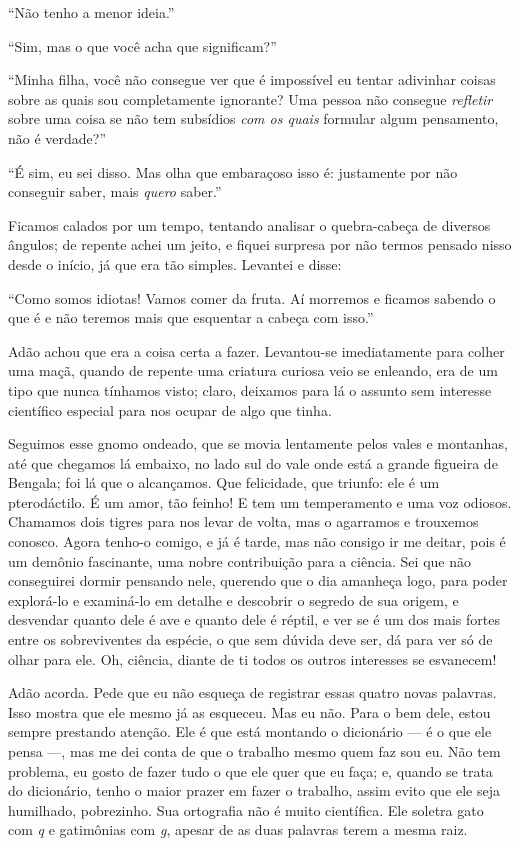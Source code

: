 “Não tenho a menor ideia.”

“Sim, mas o que você acha que significam?”

“Minha filha, você não consegue ver que é impossível eu tentar adivinhar
coisas sobre as quais sou
completamente ignorante? Uma pessoa não consegue \textit{refletir} sobre uma coisa se
não tem subsídios \textit{com os quais} formular algum pensamento, não
é verdade?”

“É sim, eu sei disso. Mas olha que embaraçoso isso é: justamente por não conseguir
saber, mais \textit{quero} saber.”

Ficamos calados por um tempo, tentando analisar o quebra-cabeça de diversos
ângulos; de repente achei um jeito, e fiquei surpresa por não termos pensado
nisso desde o início, já que era tão simples. Levantei e disse:

“Como somos idiotas! Vamos comer da fruta. Aí morremos e ficamos sabendo o que é e
não teremos mais que esquentar a cabeça com isso.”

Adão achou que era a coisa certa a fazer. Levantou-se imediatamente para colher
uma maçã, quando de repente uma criatura curiosa veio se enleando, era de um
tipo que nunca tínhamos visto; claro, deixamos para lá o assunto sem interesse
científico especial para nos ocupar de algo que tinha.

Seguimos esse gnomo ondeado, que se movia lentamente pelos vales e montanhas, até
que chegamos lá embaixo, no lado sul do vale onde está a grande figueira de
Bengala; foi lá que o alcançamos. Que felicidade, que triunfo: ele é um
pterodáctilo. É um amor, tão feinho! E tem um temperamento e uma voz odiosos.
Chamamos dois tigres para nos levar de volta, mas o agarramos e trouxemos
conosco. Agora tenho-o comigo, e já é tarde, mas não consigo ir me deitar, pois é
um demônio fascinante, uma nobre contribuição para a ciência. Sei que não
conseguirei dormir pensando nele, querendo que o dia amanheça logo, para poder
explorá-lo e examiná-lo em detalhe e descobrir o segredo de sua origem, e
desvendar quanto dele é ave e quanto dele é réptil, e ver se é um dos mais fortes
entre os sobreviventes da espécie, o que sem dúvida deve ser, dá para ver só de
olhar para ele. Oh, ciência, diante de ti todos os outros interesses se esvanecem!

Adão acorda. Pede que eu não esqueça de registrar essas quatro novas palavras. Isso
mostra que ele mesmo já as esqueceu. Mas eu não. Para o bem dele, estou sempre
prestando atenção. Ele é que está montando o dicionário --- é o que ele pensa ---, mas
me dei conta de que o trabalho mesmo quem faz sou eu. Não tem problema, eu gosto
de fazer tudo o que ele quer que eu faça; e, quando se trata do dicionário,
tenho o maior prazer em fazer o trabalho, assim evito que ele seja humilhado,
pobrezinho. Sua ortografia não é muito científica. Ele soletra gato com \textit{q} e
gatimônias com \textit{g}, apesar de as duas palavras terem a mesma raiz.

